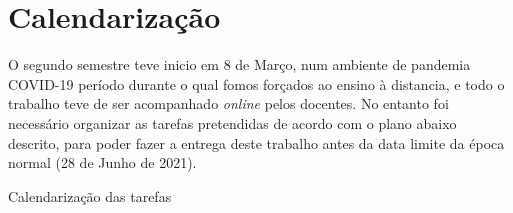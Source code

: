 \section{Calendarização}
O segundo semestre teve inicio em 8 de Março, num ambiente de pandemia COVID-19 período durante o qual fomos forçados ao ensino à distancia, e todo o trabalho teve de ser acompanhado \textit{online} pelos docentes. No entanto foi necessário organizar as tarefas pretendidas de acordo com o plano abaixo descrito, para poder fazer a entrega deste trabalho antes da data limite da época normal (28 de Junho de 2021).
\begin{table}[H]
	\caption{Calendarização das tarefas}
	\begin{ganttchart}{1}{20}
		\\
		\\
		 \\
		 \\
		 \\
		\\
		 \\
		 \\
		 \\%
		 \\%
		\\
		 \\
		 \\
		 \\
	\end{ganttchart}
	\label{gantt}
\end{table}
